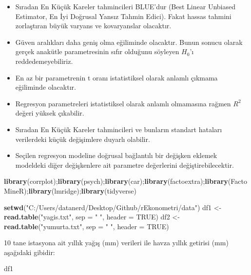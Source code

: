 \documentclass[
]{book}
\newenvironment{Shaded}{\begin{snugshade}}{\end{snugshade}}
\newcommand{\DataTypeTok}[1]{\textcolor[rgb]{0.13,0.29,0.53}{#1}}
\newcommand{\KeywordTok}[1]{\textcolor[rgb]{0.13,0.29,0.53}{\textbf{#1}}}
\newcommand{\NormalTok}[1]{#1}
\newcommand{\OtherTok}[1]{\textcolor[rgb]{0.56,0.35,0.01}{#1}}
\newcommand{\StringTok}[1]{\textcolor[rgb]{0.31,0.60,0.02}{#1}}
\begin{document}
\begin{itemize}
\item
  Sıradan En Küçük Kareler tahmincileri BLUE'dur (Best Linear Unbiased Estimator, En İyi Doğrusal Yansız Tahmin Edici). Fakat hassas tahmini zorlaştıran büyük varyans ve kovaryanslar olacaktır.
\item
  Güven aralıkları daha geniş olma eğiliminde olacaktır. Bunun sonucu olarak gerçek anakütle parametresinin sıfır olduğunu söyleyen \(H_0\)'ı reddedemeyebiliriz.
\item
  En az bir parametrenin t oranı istatistiksel olarak anlamlı çıkmama eğiliminde olacaktır.
\item
  Regresyon parametreleri istatistiksel olarak anlamlı olmamasına rağmen \(R^2\) değeri yüksek çıkabilir.
\item
  Sıradan En Küçük Kareler tahmincileri ve bunların standart hataları verilerdeki küçük değişimlere duyarlı olabilir.
\item
  Seçilen regresyon modeline doğrusal bağlantılı bir değişken eklemek modeldeki diğer değişkenlere ait parametre değerlerini değiştirebilecektir.
\end{itemize}

\begin{Shaded}
\begin{Highlighting}[]
\KeywordTok{library}\NormalTok{(corrplot);}\KeywordTok{library}\NormalTok{(psych);}\KeywordTok{library}\NormalTok{(car);}\KeywordTok{library}\NormalTok{(factoextra);}\KeywordTok{library}\NormalTok{(FactoMineR);}\KeywordTok{library}\NormalTok{(lmridge);}\KeywordTok{library}\NormalTok{(tidyverse)}

\KeywordTok{setwd}\NormalTok{(}\StringTok{"C:/Users/datanerd/Desktop/Github/rEkonometri/data"}\NormalTok{)}
\NormalTok{df1 <-}\StringTok{ }\KeywordTok{read.table}\NormalTok{(}\StringTok{"yagis.txt"}\NormalTok{, }\DataTypeTok{sep =} \StringTok{" "}\NormalTok{, }\DataTypeTok{header =} \OtherTok{TRUE}\NormalTok{)}
\NormalTok{df2 <-}\StringTok{ }\KeywordTok{read.table}\NormalTok{(}\StringTok{"yumurta.txt"}\NormalTok{, }\DataTypeTok{sep =} \StringTok{" "}\NormalTok{, }\DataTypeTok{header =} \OtherTok{TRUE}\NormalTok{)}
\end{Highlighting}
\end{Shaded}

10 tane istasyona ait yıllık yağış (mm) verileri ile havza yıllık getirisi (mm) aşağıdaki gibidir:

\begin{Shaded}
\begin{Highlighting}[]
\NormalTok{df1}
\end{Highlighting}
\end{Shaded}
\end{document}
